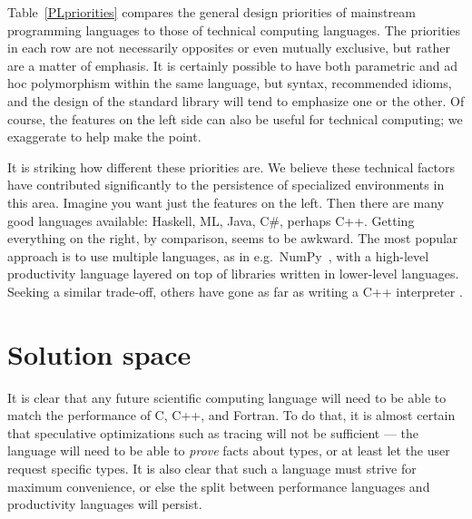 Table~\ref{PLpriorities} compares the general design priorities of mainstream
programming languages to those of technical computing languages.
The priorities in each row are not necessarily opposites or even mutually exclusive,
but rather are a matter of emphasis.
It is certainly possible to have both parametric and ad hoc polymorphism within
the same language, but syntax, recommended idioms, and the design of the standard
library will tend to emphasize one or the other.
Of course, the features on the left side can also be useful for technical computing;
we exaggerate to help make the point.

It is striking how different these priorities are.
We believe these technical factors have contributed significantly to the persistence
of specialized environments in this area.
Imagine you want just the features on the left.
Then there are many good languages available: Haskell, ML, Java, C\#, perhaps C++.
Getting everything on the right, by comparison, seems to be awkward.
The most popular approach is to use multiple languages, as in e.g.\ NumPy~\cite{numpy},
with a high-level productivity language layered on top of libraries
written in lower-level languages.
Seeking a similar trade-off, others have gone as far as writing a C++
interpreter \cite{vasilev2012cling}.




\section{Solution space}

It is clear that any future scientific computing language will need to be able to
match the performance of C, C++, and Fortran.
To do that, it is almost certain that speculative optimizations such as tracing
\cite{tracingjit} will not be sufficient ---
the language will need to be able to \emph{prove} facts about types, or at least
let the user request specific types.
It is also clear that such a language must strive for maximum convenience, or else
the split between performance languages and productivity languages will persist.

